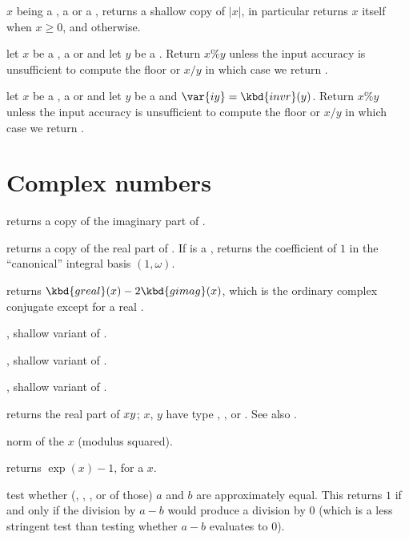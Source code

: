  $x$ being a , a  or a
, returns a shallow copy of $|x|$, in particular returns $x$ itself
when $x \geq 0$, and  otherwise.

 let $x$ be a , a  or
 and let $y$ be a . Return $x\% y$ unless the input
accuracy is unsufficient to compute the floor or $x/y$ in which case we
return .

 let $x$ be a , a  or
 and let $y$ be a  and $\var{iy} = \kbd{invr}(y)$. Return
$x\% y$ unless the input
accuracy is unsufficient to compute the floor or $x/y$ in which case we
return .

\section{Complex numbers}

 returns a copy of the imaginary part of .

 returns a copy of the real part of . If 
is a , returns the coefficient of $1$ in the ``canonical'' integral
basis $(1,\omega)$.

 returns $\kbd{greal}(x) - 2\kbd{gimag}(x)$, which is
the ordinary complex conjugate except for a real .

, shallow variant of .

, shallow variant of .

, shallow variant of .

 returns the real part of $x\*y$;
$x$, $y$ have type , ,  or . See also
.

 norm of the  $x$ (modulus squared).

 returns $\exp(x)-1$, for a  $x$.

 test whether (, ,
, or  of those) $a$ and $b$ are approximately equal.
This returns $1$ if and only if the division by $a-b$ would produce a
division by $0$ (which is a less stringent test than testing whether $a-b$
evaluates to $0$).

